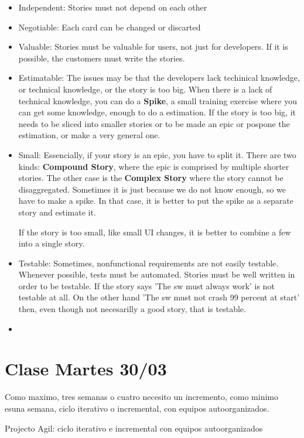 \documentclass[a4paper,12pt]{article}
\begin{document}
\begin{itemize}
\item Independent: Stories must not depend on each other
\item Negotiable: Each card can be changed or discarted
\item Valuable: Stories must be valuable for users, not just for developers. If it is possible, the customers must write the stories.
\item Estimatable: The issues may be that the developers lack techinical knowledge, or technical knowledge, or the story is too big. When there is a lack of technical knowledge, you can do a \textbf{Spike}, a small training exercise where you can get some knowledge, enough to do a estimation. If the story is too big, it needs to be sliced into smaller stories or to be made an epic or pospone the estimation, or make a very general one.
\item Small: Essencially, if your story is an epic, you have to split it. There are two kinds: \textbf{Compound Story}, where the epic is comprised by multiple shorter stories. The other case is the \textbf{Complex Story} where the story cannot be disaggregated. Sometimes it is just because we do not know enough, so we have to make a spike. In that case, it is better to put the spike as a separate story and estimate it.

  If the story is too small, like small UI changes, it is better to combine a few into a single story.

\item Testable: Sometimes, nonfunctional requirements are not easily testable.  Whenever possible, tests must be automated. Stories must be well written in order to be testable. If the story says 'The sw must always work' is not testable at all. On the other hand 'The sw must not crash 99 percent at start' then, even though not necesarilly a good story, that is testable.
\item 
\end{itemize}

\section{Clase Martes 30/03}

Como maximo, tres semanas o cuatro necesito un incremento, como minimo esuna semana, ciclo iterativo o incremental, con equipos autoorganizados.

Projecto Agil: ciclo iterativo e incremental con equipos autoorganizados
\end{document}
